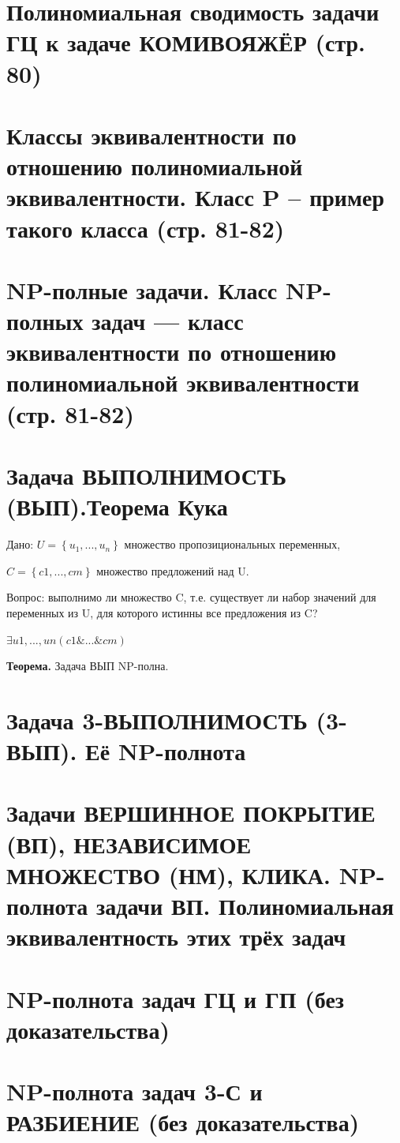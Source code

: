 \documentclass[40pt]{article}
\begin{document}
\section{Полиномиальная сводимость задачи ГЦ к задаче КОМИВОЯЖЁР (стр. 80)}


\section{Классы эквивалентности по отношению полиномиальной эквивалентности. Класс P – пример такого класса (стр. 81-82)}
\section{NP-полные задачи. Класс NP-полных задач — класс эквивалентности по отношению полиномиальной эквивалентности (стр. 81-82)}
\section{Задача ВЫПОЛНИМОСТЬ (ВЫП).Теорема Кука}

Дано: $U = \left\{u_1, ..., u_n\right\}$ множество пропозициональных переменных,

$C = \left\{c1, ..., cm\right\}$ множество предложений над U.

Вопрос: выполнимо ли множество C, т.е. существует ли набор значений
для переменных из U, для которого истинны все предложения из C?

$\exists u1, ..., un(c1 \& ... \& cm)$

\textbf{Теорема.} Задача ВЫП NP-полна.


\section{Задача 3-ВЫПОЛНИМОСТЬ (3-ВЫП). Её NP-полнота}
\section{Задачи ВЕРШИННОЕ ПОКРЫТИЕ (ВП), НЕЗАВИСИМОЕ МНОЖЕСТВО (НМ), КЛИКА.  NP-полнота задачи ВП.  Полиномиальная эквивалентность этих трёх задач}
\section{NP-полнота задач ГЦ и ГП (без доказательства)}
\section{NP-полнота задач 3-С и РАЗБИЕНИЕ (без доказательства)}
\end{document}
